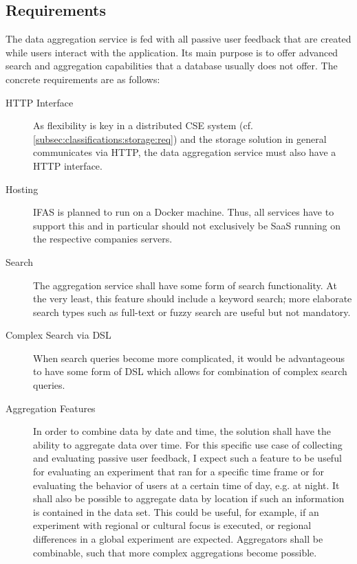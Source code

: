 \subsection{Requirements}

The data aggregation service is fed with all passive user feedback that are created while users interact with the application.
Its main purpose is to offer advanced search and aggregation capabilities that a database usually does not offer.
The concrete requirements are as follows:

\begin{description}
\item [HTTP Interface]
As flexibility is key in a distributed \ac{CSE} system (cf. \cref{subsec:classifications:storage:req}) and the storage solution in general communicates via HTTP, the data aggregation service must also have a HTTP interface.
\item [Hosting]
\ac{IFAS} is planned to run on a Docker machine.
Thus, all services have to support this and in particular should not exclusively be \ac{SaaS} running on the respective companies servers.
\item [Search]
The aggregation service shall have some form of search functionality.
At the very least, this feature should include a keyword search; more elaborate search types such as full-text or fuzzy search are useful but not mandatory.
\item [Complex Search via DSL]
When search queries become more complicated, it would be advantageous to have some form of \ac{DSL} which allows for combination of complex search queries.
\item [Aggregation Features]
In order to combine data by date and time, the solution shall have the ability to aggregate data over time.
For this specific use case of collecting and evaluating passive user feedback, I expect such a feature to be useful for evaluating an experiment that ran for a specific time frame or for evaluating the behavior of users at a certain time of day, e.g. at night.
It shall also be possible to aggregate data by location if such an information is contained in the data set.
This could be useful, for example, if an experiment with regional or cultural focus is executed, or regional differences in a global experiment are expected.
Aggregators shall be combinable, such that more complex aggregations become possible.

\end{description}
